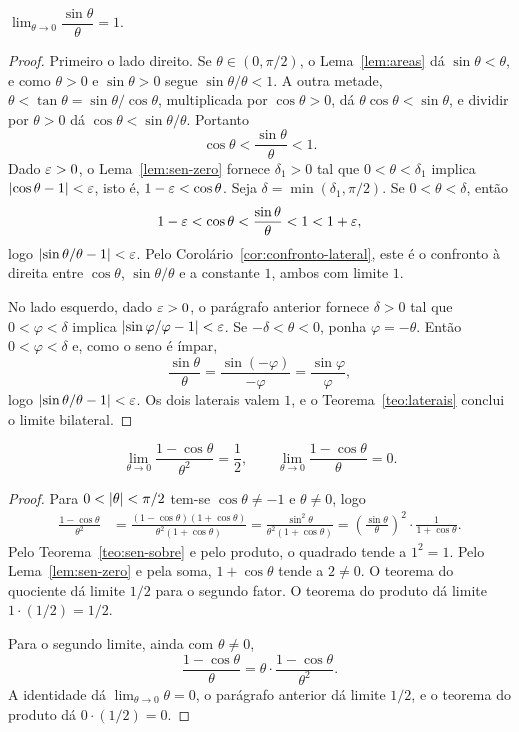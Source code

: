 \documentclass[11pt,a4paper]{article}
\begin{document}
\begin{teorema}
\label{teo:sen-sobre}
$\lim_{\theta\to 0}\dfrac{\sin\theta}{\theta}=1$.
\end{teorema}

\begin{proof}
Primeiro o lado direito. Se $\theta\in(0,\pi/2)$, o Lema~\ref{lem:areas} d\'a $\sin\theta<\theta$, e como $\theta>0$ e $\sin\theta>0$ segue $\sin\theta/\theta<1$. A outra metade, $\theta<\tan\theta=\sin\theta/\cos\theta$, multiplicada por $\cos\theta>0$, d\'a $\theta\cos\theta<\sin\theta$, e dividir por $\theta>0$ d\'a $\cos\theta<\sin\theta/\theta$. Portanto
\[
\cos\theta<\frac{\sin\theta}{\theta}<1.
\]
Dado $\varepsilon>0$, o Lema~\ref{lem:sen-zero} fornece $\delta_1>0$ tal que $0<\theta<\delta_1$ implica $\left\lvert \cos\theta-1 \right\rvert<\varepsilon$, isto \'e, $1-\varepsilon<\cos\theta$. Seja $\delta=\min(\delta_1,\pi/2)$. Se $0<\theta<\delta$, ent\~ao
\[
1-\varepsilon<\cos\theta<\frac{\sin\theta}{\theta}<1<1+\varepsilon,
\]
logo $\left\lvert \sin\theta/\theta-1 \right\rvert<\varepsilon$. Pelo Corol\'ario~\ref{cor:confronto-lateral}, este \'e o confronto \`a direita entre $\cos\theta$, $\sin\theta/\theta$ e a constante $1$, ambos com limite $1$.

No lado esquerdo, dado $\varepsilon>0$, o par\'agrafo anterior fornece $\delta>0$ tal que $0<\varphi<\delta$ implica $\left\lvert \sin\varphi/\varphi-1 \right\rvert<\varepsilon$. Se $-\delta<\theta<0$, ponha $\varphi=-\theta$. Ent\~ao $0<\varphi<\delta$ e, como o seno \'e \'impar,
\[
\frac{\sin\theta}{\theta}=\frac{\sin(-\varphi)}{-\varphi}=\frac{\sin\varphi}{\varphi},
\]
logo $\left\lvert \sin\theta/\theta-1 \right\rvert<\varepsilon$. Os dois laterais valem $1$, e o Teorema~\ref{teo:laterais} conclui o limite bilateral.
\end{proof}

\begin{teorema}
\label{teo:1-cos}
\[
\lim_{\theta\to 0}\frac{1-\cos\theta}{\theta^2}=\frac12,
\qquad
\lim_{\theta\to 0}\frac{1-\cos\theta}{\theta}=0.
\]
\end{teorema}

\begin{proof}
Para $0<\left\lvert \theta \right\rvert<\pi/2$ tem-se $\cos\theta\neq -1$ e $\theta\neq 0$, logo
\begin{align*}
\frac{1-\cos\theta}{\theta^2}
&=\frac{(1-\cos\theta)(1+\cos\theta)}{\theta^2(1+\cos\theta)}
=\frac{\sin^2\theta}{\theta^2(1+\cos\theta)}
=\left(\frac{\sin\theta}{\theta}\right)^2\cdot\frac{1}{1+\cos\theta}.
\end{align*}
Pelo Teorema~\ref{teo:sen-sobre} e pelo produto, o quadrado tende a $1^2=1$. Pelo Lema~\ref{lem:sen-zero} e pela soma, $1+\cos\theta$ tende a $2\neq 0$. O teorema do quociente d\'a limite $1/2$ para o segundo fator. O teorema do produto d\'a limite $1\cdot(1/2)=1/2$.

Para o segundo limite, ainda com $\theta\neq 0$,
\[
\frac{1-\cos\theta}{\theta}=\theta\cdot\frac{1-\cos\theta}{\theta^2}.
\]
A identidade d\'a $\lim_{\theta\to 0}\theta=0$, o par\'agrafo anterior d\'a limite $1/2$, e o teorema do produto d\'a $0\cdot(1/2)=0$.
\end{proof}
\end{document}
